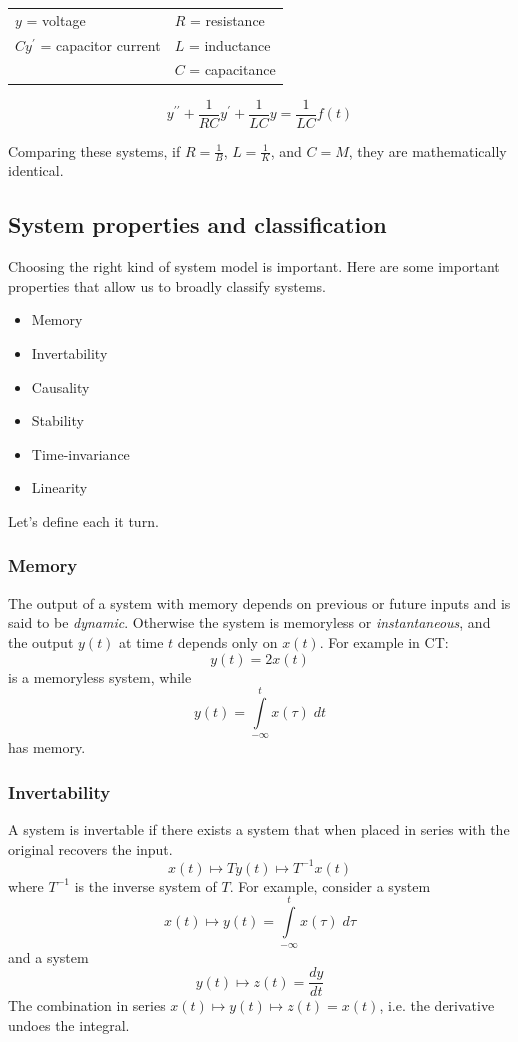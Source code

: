 \begin{tabular}{ll}
  $y$ = voltage & $R$ = resistance\\
  $Cy^\prime$ = capacitor current & $L$ = inductance\\
  & $C$ = capacitance\\
\end{tabular}

\[
y^{\prime\prime} + \frac{1}{RC} y^\prime + \frac{1}{LC}y = \frac{1}{LC}f(t)
\]

Comparing these systems, if $R = \frac{1}{B}$, $L = \frac{1}{K}$, and $C = M$, they are mathematically identical.

\subsection{System properties and classification}

Choosing the right kind of system model is important. Here are some important properties that allow us to broadly classify systems.
\begin{itemize}
\item Memory
\item Invertability
\item Causality
\item Stability
\item Time-invariance
\item Linearity
\end{itemize}

Let's define each it turn.

\subsubsection{Memory}
The output of a system with memory depends on previous or future inputs and is said to be {\it dynamic}. Otherwise the system is memoryless or {\it instantaneous}, and the output $y(t)$ at time $t$ depends only on $x(t)$.
For example in CT:
\[
y(t) = 2x(t)
\]
is a memoryless system, while
\[
y(t) = \int\limits_{-\infty}^{t} x(\tau) \; dt
\]
has memory.

\subsubsection{Invertability}

A system is invertable if there exists a system that when placed in series with the original recovers the input.
\[
x(t) \mapsto{T} y(t) \mapsto{T^{-1}} x(t)
\]
where $T^{-1}$ is the inverse system of $T$. For example, consider a system
\[
x(t) \mapsto y(t) = \int\limits_{-\infty}^t x(\tau) \; d\tau
\]
and a system
\[
y(t) \mapsto z(t) = \frac{dy}{dt} 
\]
The combination in series $x(t) \mapsto y(t) \mapsto z(t) = x(t)$, i.e. the derivative undoes the integral.

